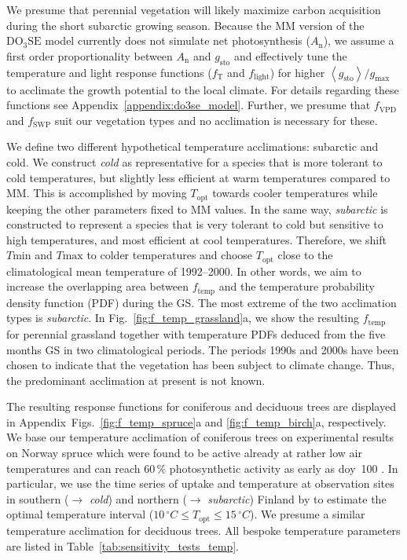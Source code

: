 \documentclass[bg, manuscript]{copernicus}
\begin{document}
We presume that perennial vegetation will likely maximize carbon acquisition during the short subarctic growing season. Because the MM version of the $\mathrm{DO_3SE}$ model currently does not simulate net photosynthesis ($A_\mathrm{n}$), we assume a first order proportionality between $A_\mathrm{n}$ and $g_\mathrm{sto}$ \citep{GCB:Medlyn2011} and effectively tune the temperature and light response functions ($f_\mathrm{T}$ and $f_\mathrm{light}$) for higher $\left<g_\mathrm{sto}\right>/g_\mathrm{max}$ to acclimate the growth potential to the local climate. For details regarding these functions see Appendix~\ref{appendix:do3se_model}. Further, we presume that $f_\mathrm{VPD}$ and $f_\mathrm{SWP}$ suit our vegetation types and no acclimation is necessary for these. 

We define two different hypothetical temperature acclimations: subarctic and cold. We construct \emph{cold} as representative for a species that is more tolerant to cold temperatures, but slightly less efficient at warm temperatures compared to MM. This is accomplished by moving $T_\mathrm{opt}$ towards cooler temperatures while keeping the other parameters fixed to MM values. In the same way, \emph{subarctic} is constructed to represent a species that is very tolerant to cold but sensitive to high temperatures, and most efficient at cool temperatures. Therefore, we shift $T\mathrm{min}$ and $T\mathrm{max}$ to colder temperatures and choose $T_\mathrm{opt}$ close to the climatological mean temperature of 1992--2000. In other words, we aim to increase the overlapping area between $f_\mathrm{temp}$ and the temperature probability density function (PDF) during the GS. The most extreme of the two acclimation types is \emph{subarctic}.
In Fig.~\ref{fig:f_temp_grassland}a, we show the resulting $f_\mathrm{temp}$ for perennial grassland together with temperature PDFs deduced from the five months GS in two climatological periods. The periods 1990s and 2000s have been chosen to indicate that the vegetation has been subject to climate change. Thus, the predominant acclimation at present is not known.

The resulting response functions for coniferous and deciduous trees are displayed in Appendix~Figs.~\ref{fig:f_temp_spruce}a and \ref{fig:f_temp_birch}a, respectively. We base our temperature acclimation of coniferous trees on experimental results on Norway spruce which were found to be active already at rather low air temperatures and can reach $60\,\unit{\%}$ photosynthetic activity as early as \unit{doy}~100 \citep{TB:Kolari2007, TP:Wallin2013}. In particular, we use the time series of  uptake and temperature at observation sites in southern ($\rightarrow$ \emph{cold}) and northern ($\rightarrow$ \emph{subarctic}) Finland by \citet{TB:Kolari2007} to estimate the optimal temperature interval ($10\,\unit{^\circ C}\le T_\mathrm{opt} \le 15\,\unit{^\circ C}$). We presume a similar temperature acclimation for deciduous trees. All bespoke temperature parameters are listed in Table~\ref{tab:sensitivity_tests_temp}.\\
\end{document}
